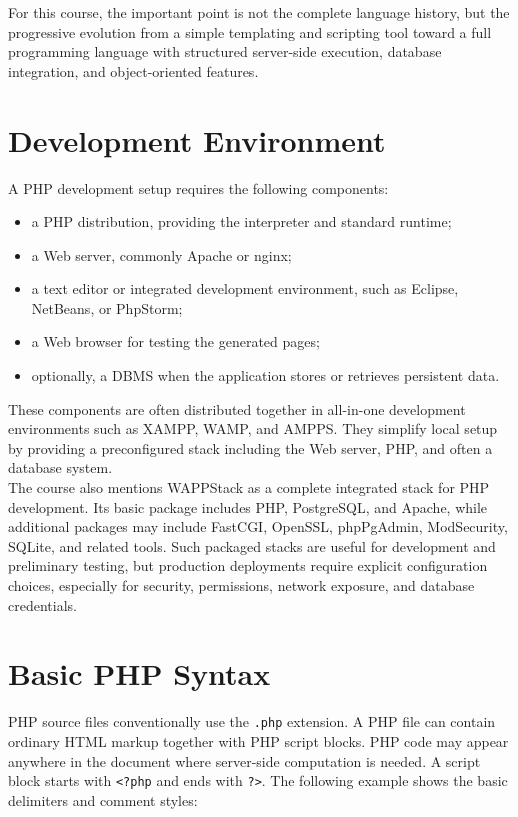 \documentclass{scrbook}
\begin{document}
	For this course, the important point is not the complete language history, but the progressive evolution from a simple templating and scripting tool toward a full programming language with structured server-side execution, database integration, and object-oriented features.
	
	\section{Development Environment}
	
	A PHP development setup requires the following components:
	
	\begin{itemize}
		\item a PHP distribution, providing the interpreter and standard runtime;
		\item a Web server, commonly Apache or nginx;
		\item a text editor or integrated development environment, such as Eclipse, NetBeans, or PhpStorm;
		\item a Web browser for testing the generated pages;
		\item optionally, a DBMS when the application stores or retrieves persistent data.
	\end{itemize}
	
	These components are often distributed together in all-in-one development environments such as XAMPP, WAMP, and AMPPS. They simplify local setup by providing a preconfigured stack including the Web server, PHP, and often a database system.\\
	
	The course also mentions WAPPStack as a complete integrated stack for PHP development. Its basic package includes PHP, PostgreSQL, and Apache, while additional packages may include FastCGI, OpenSSL, phpPgAdmin, ModSecurity, SQLite, and related tools. Such packaged stacks are useful for development and preliminary testing, but production deployments require explicit configuration choices, especially for security, permissions, network exposure, and database credentials.
	
	\section{Basic PHP Syntax}
	
	PHP source files conventionally use the \texttt{.php} extension. A PHP file can contain ordinary HTML markup together with PHP script blocks. PHP code may appear anywhere in the document where server-side computation is needed. A script block starts with \texttt{\textless?php} and ends with \texttt{?\textgreater}. The following example shows the basic delimiters and comment styles:
	
\end{document}
